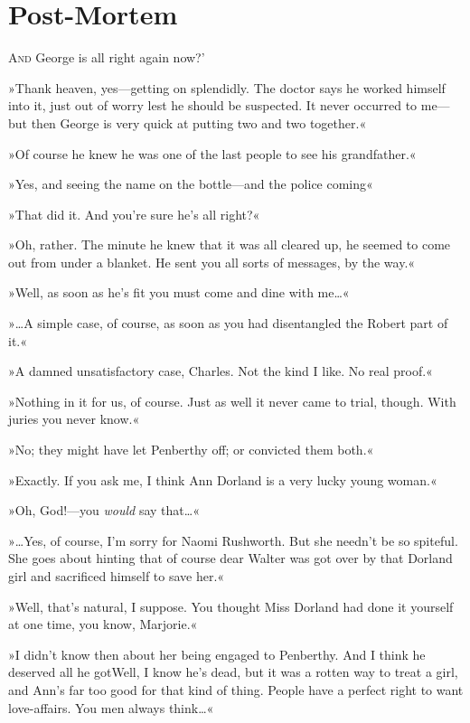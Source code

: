 \chapter{Post-Mortem}

\lettrine[lines=4,ante=‘]{A}{nd} George is all right again now?'

\zz
»Thank heaven, yes—getting on splendidly. The doctor says he worked himself into it, just out of worry lest he should be suspected. It never occurred to me—but then George is very quick at putting two and two together.«

»Of course he knew he was one of the last people to see his grandfather.«

»Yes, and seeing the name on the bottle—and the police coming\longdash«

»That did it. And you're sure he's all right?«

»Oh, rather. The minute he knew that it was all cleared up, he seemed to come out from under a blanket. He sent you all sorts of messages, by the way.«

»Well, as soon as he's fit you must come and dine with me\dots«

»\dots A simple case, of course, as soon as you had disentangled the Robert part of it.«

»A damned unsatisfactory case, Charles. Not the kind I like. No real proof.«

»Nothing in it for us, of course. Just as well it never came to trial, though. With juries you never know.«

»No; they might have let Penberthy off; or convicted them both.«

»Exactly. If you ask me, I think Ann Dorland is a very lucky young woman.«

»Oh, God!—you \textit{would} say that\dots«

»\dots Yes, of course, I'm sorry for Naomi Rushworth. But she needn't be so spiteful. She goes about hinting that of course dear Walter was got over by that Dorland girl and sacrificed himself to save her.«

»Well, that's natural, I suppose. You thought Miss Dorland had done it yourself at one time, you know, Marjorie.«

»I didn't know then about her being engaged to Penberthy. And I think he deserved all he got\textellipsis Well, I know he's dead, but it was a rotten way to treat a girl, and Ann's far too good for that kind of thing. People have a perfect right to want love-affairs. You men always think\dots«

